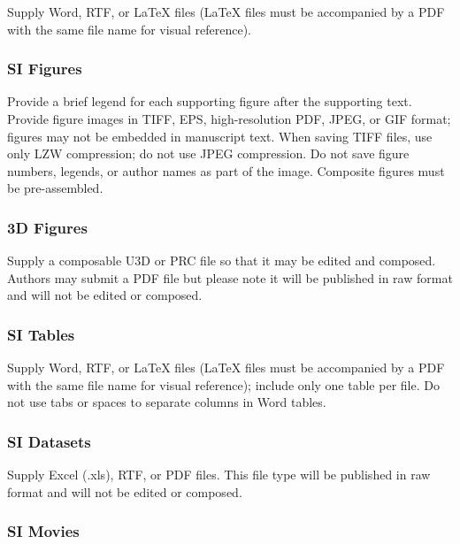 \documentclass[9pt,twocolumn,twoside,]{pnas-new}
\begin{document}
Supply Word, RTF, or LaTeX files (LaTeX files must be accompanied by a
PDF with the same file name for visual reference).

\hypertarget{si-figures}{%
\subsubsection*{SI Figures}\label{si-figures}}

Provide a brief legend for each supporting figure after the supporting
text. Provide figure images in TIFF, EPS, high-resolution PDF, JPEG, or
GIF format; figures may not be embedded in manuscript text. When saving
TIFF files, use only LZW compression; do not use JPEG compression. Do
not save figure numbers, legends, or author names as part of the image.
Composite figures must be pre-assembled.

\hypertarget{d-figures}{%
\subsubsection*{3D Figures}\label{d-figures}}

Supply a composable U3D or PRC file so that it may be edited and
composed. Authors may submit a PDF file but please note it will be
published in raw format and will not be edited or composed.

\hypertarget{si-tables}{%
\subsubsection*{SI Tables}\label{si-tables}}

Supply Word, RTF, or LaTeX files (LaTeX files must be accompanied by a
PDF with the same file name for visual reference); include only one
table per file. Do not use tabs or spaces to separate columns in Word
tables.

\hypertarget{si-datasets}{%
\subsubsection*{SI Datasets}\label{si-datasets}}

Supply Excel (.xls), RTF, or PDF files. This file type will be published
in raw format and will not be edited or composed.

\hypertarget{si-movies}{%
\subsubsection*{SI Movies}\label{si-movies}}
\end{document}
